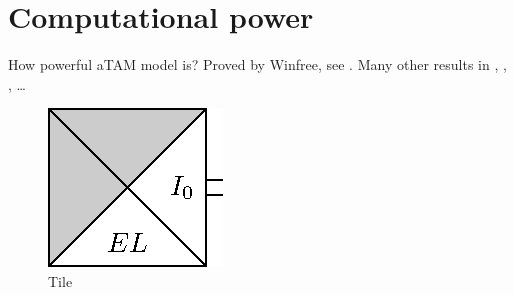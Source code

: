 \chapter{Computational power}
	
	How powerful aTAM model is? Proved by Winfree, see \cite{winfree_phd}. Many other results in \cite{cook_temp1}, \cite{stage_assembly}, \cite{square_lb}, \cite{square_ub} \ldots
	
	\begin{figure}[H]
	\begin{center}
		\includegraphics{./plots/tile-1.eps}
		\caption{Tile}
	\end{center}
	\end{figure}